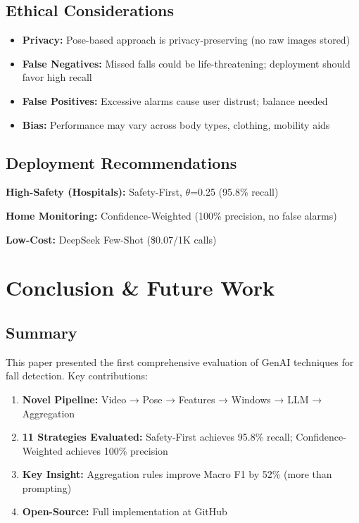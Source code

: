 \documentclass[conference]{IEEEtran}
\begin{document}
\subsection{Ethical Considerations}

\begin{itemize}[leftmargin=*]
    \item \textbf{Privacy:} Pose-based approach is privacy-preserving (no raw images stored)
    \item \textbf{False Negatives:} Missed falls could be life-threatening; deployment should favor high recall
    \item \textbf{False Positives:} Excessive alarms cause user distrust; balance needed
    \item \textbf{Bias:} Performance may vary across body types, clothing, mobility aids
\end{itemize}

\subsection{Deployment Recommendations}

\textbf{High-Safety (Hospitals):} Safety-First, $\theta$=0.25 (95.8\% recall)

\textbf{Home Monitoring:} Confidence-Weighted (100\% precision, no false alarms)

\textbf{Low-Cost:} DeepSeek Few-Shot (\$0.07/1K calls)

\section{Conclusion \& Future Work}

\subsection{Summary}

This paper presented the first comprehensive evaluation of GenAI techniques for fall detection. Key contributions:

\begin{enumerate}[leftmargin=*]
    \item \textbf{Novel Pipeline:} Video → Pose → Features → Windows → LLM → Aggregation
    \item \textbf{11 Strategies Evaluated:} Safety-First achieves 95.8\% recall; Confidence-Weighted achieves 100\% precision
    \item \textbf{Key Insight:} Aggregation rules improve Macro F1 by 52\% (more than prompting)
    \item \textbf{Open-Source:} Full implementation at GitHub
\end{enumerate}
\end{document}
